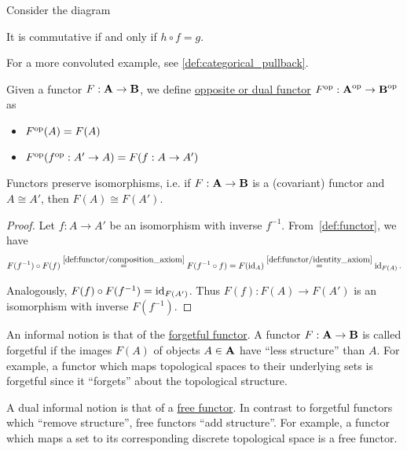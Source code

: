 \begin{example}\label{ex:commutative_diagrams}
  Consider the diagram
  \begin{center}
  \end{center}

  It is commutative if and only if $h \circ f = g$.

  For a more convoluted example, see \cref{def:categorical_pullback}.
\end{example}

\begin{definition}\label{def:opposite_functor}\cite[definition 5.2.1]{Leinster2014}
  Given a functor $F: \operatorname{\mathbf{A}} \to \operatorname{\mathbf{B}}$, we define \uline{opposite or dual functor} $F^{\operatorname{op}}: \operatorname{\mathbf{A}}^{\operatorname{op}} \to \operatorname{\mathbf{B}}^{\operatorname{op}}$ as
  \begin{itemize}
    \item $F^{\operatorname{op}}(A) = F(A)$
    \item $F^{\operatorname{op}}(f^{\operatorname{op}}: A' \to A) = F(f: A \to A')$
  \end{itemize}
\end{definition}

\begin{proposition}\label{thm:functors_preserve_isomorphisms}\cite[exercise 1.2.21]{Leinster2014}
  Functors preserve isomorphisms, i.e. if $F: \operatorname{\mathbf{A}} \to \operatorname{\mathbf{B}}$ is a (covariant) functor and $A \cong A'$, then $F(A) \cong F(A')$.
\end{proposition}
\begin{proof}
  Let $f: A \to A'$ be an isomorphism with inverse $f^{-1}$. From~\cref{def:functor}, we have
  \begin{align*}
    F(f^{-1}) \circ F(f)
    \overset{\ref{def:functor/composition_axiom}} =
    F(f^{-1} \circ f)
    =
    F(\operatorname{id}_A)
    \overset{\ref{def:functor/identity_axiom}} =
    \operatorname{id}_{F(A)}.
  \end{align*}

  Analogously, $F(f) \circ F(f^{-1}) = \operatorname{id}_{F(A')}$. Thus $F(f): F(A) \to F(A')$ is an isomorphism with inverse $F(f^{-1})$.
\end{proof}

\begin{note}\label{note:forgetful_free_functor}\cite[examples 1.2.3, 1.2.4]{Leinster2014}
  An informal notion is that of the \uline{forgetful functor}. A functor $F: \operatorname{\mathbf{A}} \to \operatorname{\mathbf{B}}$ is called forgetful if the images $F(A)$ of objects $A \in \operatorname{\mathbf{A}}$ have \enquote{less structure} than $A$. For example, a functor which maps topological spaces to their underlying sets is forgetful since it \enquote{forgets} about the topological structure.

  A dual informal notion is that of a \uline{free functor}. In contrast to forgetful functors which \enquote{remove structure}, free functors \enquote{add structure}. For example, a functor which maps a set to its corresponding discrete topological space is a free functor.
\end{note}

